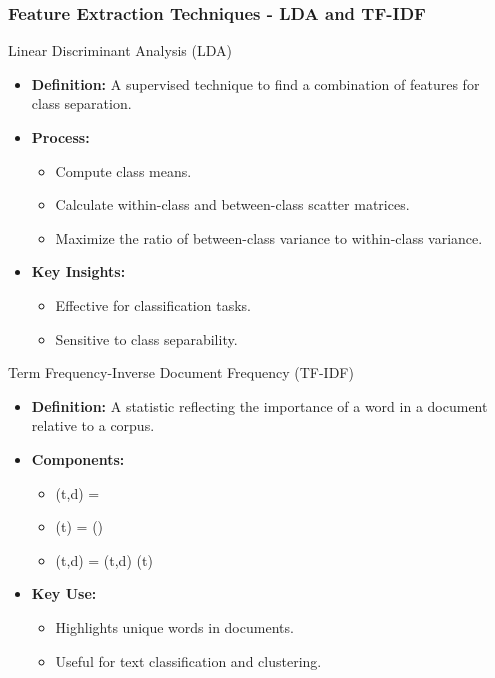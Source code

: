\documentclass[aspectratio=169]{beamer}
\begin{document}
\begin{frame}[fragile]
    \frametitle{Feature Extraction Techniques - LDA and TF-IDF}
    \begin{block}{Linear Discriminant Analysis (LDA)}
        \begin{itemize}
            \item \textbf{Definition:} A supervised technique to find a combination of features for class separation.
            \item \textbf{Process:}
            \begin{itemize}
                \item Compute class means.
                \item Calculate within-class and between-class scatter matrices.
                \item Maximize the ratio of between-class variance to within-class variance.
            \end{itemize}
            \item \textbf{Key Insights:}
            \begin{itemize}
                \item Effective for classification tasks.
                \item Sensitive to class separability.
            \end{itemize}
        \end{itemize}
    \end{block}

    \begin{block}{Term Frequency-Inverse Document Frequency (TF-IDF)}
        \begin{itemize}
            \item \textbf{Definition:} A statistic reflecting the importance of a word in a document relative to a corpus.
            \item \textbf{Components:}
            \begin{itemize}
                \item {}(t,d) = 
                \item {}(t) = \log\left(\right)
                \item {}(t,d) = (t,d) \times {}(t)
            \end{itemize}
            \item \textbf{Key Use:}
            \begin{itemize}
                \item Highlights unique words in documents.
                \item Useful for text classification and clustering.
            \end{itemize}
        \end{itemize}
    \end{block}
\end{frame}
\end{document}
